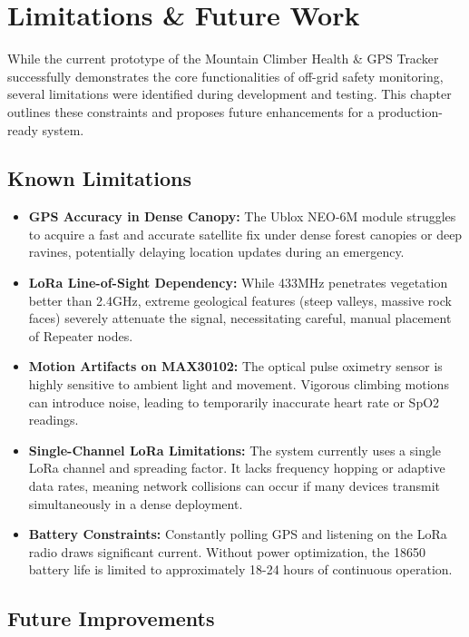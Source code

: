 \chapter{Limitations \& Future Work}
\label{ch:limitations}

While the current prototype of the Mountain Climber Health \& GPS Tracker successfully demonstrates the core functionalities of off-grid safety monitoring, several limitations were identified during development and testing. This chapter outlines these constraints and proposes future enhancements for a production-ready system.

\section{Known Limitations}

\begin{itemize}
    \item \textbf{GPS Accuracy in Dense Canopy:} The Ublox NEO-6M module struggles to acquire a fast and accurate satellite fix under dense forest canopies or deep ravines, potentially delaying location updates during an emergency.
    \item \textbf{LoRa Line-of-Sight Dependency:} While 433MHz penetrates vegetation better than 2.4GHz, extreme geological features (steep valleys, massive rock faces) severely attenuate the signal, necessitating careful, manual placement of Repeater nodes.
    \item \textbf{Motion Artifacts on MAX30102:} The optical pulse oximetry sensor is highly sensitive to ambient light and movement. Vigorous climbing motions can introduce noise, leading to temporarily inaccurate heart rate or SpO2 readings.
    \item \textbf{Single-Channel LoRa Limitations:} The system currently uses a single LoRa channel and spreading factor. It lacks frequency hopping or adaptive data rates, meaning network collisions can occur if many devices transmit simultaneously in a dense deployment.
    \item \textbf{Battery Constraints:} Constantly polling GPS and listening on the LoRa radio draws significant current. Without power optimization, the 18650 battery life is limited to approximately 18-24 hours of continuous operation.
\end{itemize}

\section{Future Improvements}

